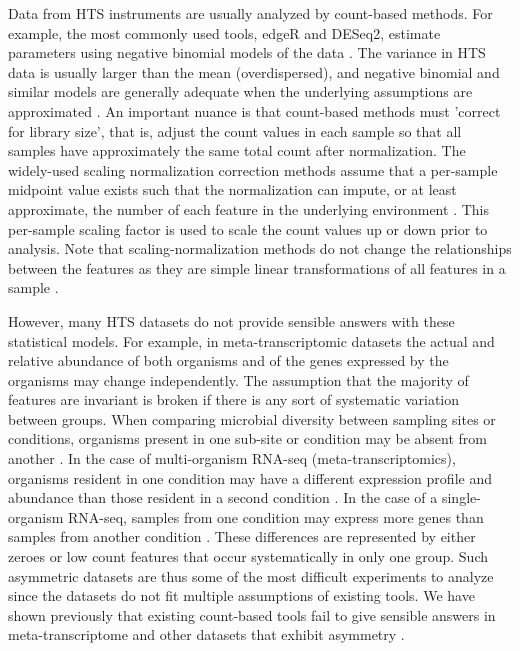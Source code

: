 \documentclass[graybox]{svmult}
\begin{document}
Data from HTS instruments are usually analyzed by count-based methods. For example, the most commonly used tools, edgeR and DESeq2, estimate parameters using  negative binomial models of the data \cite{Robinson:2010,Love:2014aa}. The variance in HTS data is usually larger than the mean (overdispersed), and negative binomial and similar models are generally adequate when the underlying assumptions are approximated \cite{Gierlinski:2015aa}. An important nuance is that  count-based methods must 'correct for library size', that is, adjust the count values in each sample so that all samples have approximately the same total count after normalization. The widely-used scaling normalization correction methods assume that a per-sample midpoint value exists such that the normalization can impute, or at least approximate, the number of each feature in the underlying environment \cite{Robinson:2010a,Dillies:2013}. This per-sample scaling factor is used to scale the count values up or down prior to analysis. Note that scaling-normalization methods do not change the relationships between the features as they are simple linear transformations of all features in a sample \cite{Quinn206425}.

However, many HTS datasets do not provide sensible answers with these statistical models. For example, in meta-transcriptomic datasets the actual and relative abundance of both  organisms and of the genes expressed by the organisms may change independently. The assumption that the majority of features are invariant is broken if there is any sort of systematic variation between groups. When comparing microbial diversity between sampling sites or conditions, organisms present in one sub-site or condition may be absent from another \cite{Macklaim:2015aa,Hummelen:2010,Gajer:2012}. In the case of multi-organism RNA-seq (meta-transcriptomics), organisms resident in one condition may have a different expression profile and abundance than those resident in a second condition \cite{macklaim:2013}. In the case of a single-organism RNA-seq, samples from one condition may express more genes than samples from another condition \cite{Lang:2015aa,Peng:2014aa,Zhao:2013aa,Gierlinski:2015aa}. These differences are represented by either zeroes or low count features that occur systematically in only one group. Such asymmetric datasets are thus some of the most difficult experiments to analyze \cite{macklaim:2013,fernandes:2013} since the datasets do not fit multiple assumptions of existing tools. We have shown previously that existing count-based tools fail to give sensible answers in meta-transcriptome and other datasets that exhibit asymmetry  \cite{fernandes:2013, fernandes:2014,gloorAJS:2016}. 
\end{document}
